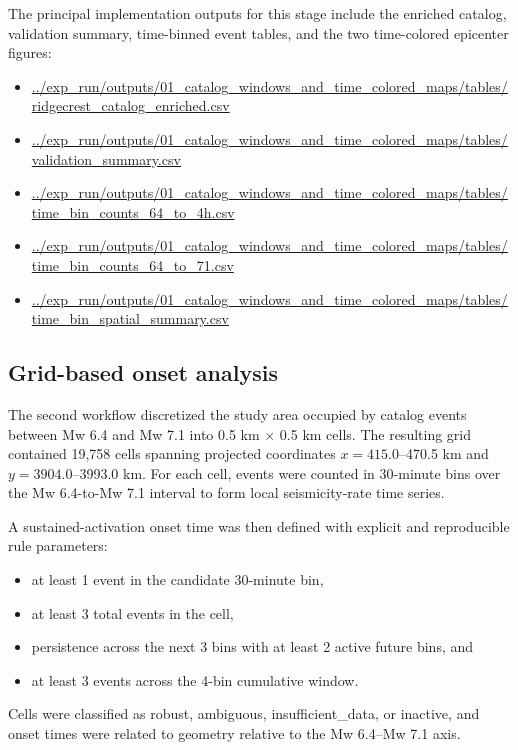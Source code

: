 \documentclass[11pt]{article}
\begin{document}
The principal implementation outputs for this stage include the enriched catalog, validation summary, time-binned event tables, and the two time-colored epicenter figures:
\begin{itemize}[leftmargin=1.5em]
    \item \url{../exp_run/outputs/01_catalog_windows_and_time_colored_maps/tables/ridgecrest_catalog_enriched.csv}
    \item \url{../exp_run/outputs/01_catalog_windows_and_time_colored_maps/tables/validation_summary.csv}
    \item \url{../exp_run/outputs/01_catalog_windows_and_time_colored_maps/tables/time_bin_counts_64_to_4h.csv}
    \item \url{../exp_run/outputs/01_catalog_windows_and_time_colored_maps/tables/time_bin_counts_64_to_71.csv}
    \item \url{../exp_run/outputs/01_catalog_windows_and_time_colored_maps/tables/time_bin_spatial_summary.csv}
\end{itemize}

\subsection{Grid-based onset analysis}
The second workflow discretized the study area occupied by catalog events between Mw 6.4 and Mw 7.1 into 0.5 km $\times$ 0.5 km cells. The resulting grid contained 19,758 cells spanning projected coordinates $x=415.0$--470.5 km and $y=3904.0$--3993.0 km. For each cell, events were counted in 30-minute bins over the Mw 6.4-to-Mw 7.1 interval to form local seismicity-rate time series.

A sustained-activation onset time was then defined with explicit and reproducible rule parameters:
\begin{itemize}[leftmargin=1.5em]
    \item at least 1 event in the candidate 30-minute bin,
    \item at least 3 total events in the cell,
    \item persistence across the next 3 bins with at least 2 active future bins, and
    \item at least 3 events across the 4-bin cumulative window.
\end{itemize}
Cells were classified as robust, ambiguous, insufficient\_data, or inactive, and onset times were related to geometry relative to the Mw 6.4--Mw 7.1 axis.
\end{document}
